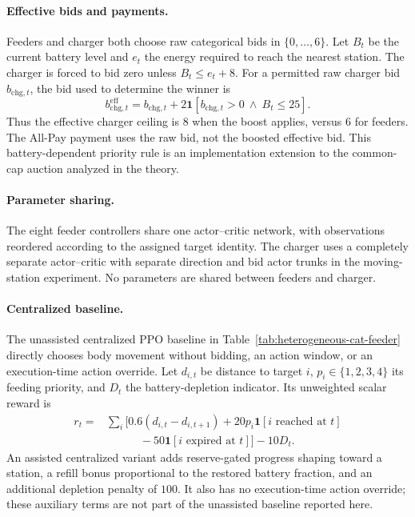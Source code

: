 \paragraph{Effective bids and payments.}
Feeders and charger both choose raw categorical bids in $\{0,\ldots,6\}$.
Let $B_t$ be the current battery level and $e_t$ the energy required to reach the nearest station.
The charger is forced to bid zero unless $B_t\leq e_t+8$.
For a permitted raw charger bid $b_{\mathrm{chg},t}$, the bid used to determine the winner is
\begin{equation}
  b^{\mathrm{eff}}_{\mathrm{chg},t}
  = b_{\mathrm{chg},t}
    +2\mathbf{1}[b_{\mathrm{chg},t}>0\ \land\ B_t\leq25].
\end{equation}
Thus the effective charger ceiling is 8 when the boost applies, versus 6 for feeders.
The All-Pay payment uses the raw bid, not the boosted effective bid.
This battery-dependent priority rule is an implementation extension to the common-cap auction analyzed in the theory.

\paragraph{Parameter sharing.}
The eight feeder controllers share one actor--critic network, with observations reordered according to the assigned target identity.
The charger uses a completely separate actor--critic with separate direction and bid actor trunks in the moving-station experiment.
No parameters are shared between feeders and charger.

\paragraph{Centralized baseline.}
The unassisted centralized PPO baseline in Table~\ref{tab:heterogeneous-cat-feeder} directly chooses body movement without bidding, an action window, or an execution-time action override.
Let $d_{i,t}$ be distance to target $i$, $p_i\in\{1,2,3,4\}$ its feeding priority, and $D_t$ the battery-depletion indicator.
Its unweighted scalar reward is
\begin{equation}
\begin{split}
 r_t={}&\sum_i\bigl[0.6(d_{i,t}-d_{i,t+1})
       +20p_i\mathbf{1}[i\text{ reached at }t]\\
       &\hspace{3em}-50\mathbf{1}[i\text{ expired at }t]\bigr]-10D_t.
\end{split}
\end{equation}
An assisted centralized variant adds reserve-gated progress shaping toward a station, a refill bonus proportional to the restored battery fraction, and an additional depletion penalty of $100$.
It also has no execution-time action override; these auxiliary terms are not part of the unassisted baseline reported here.

